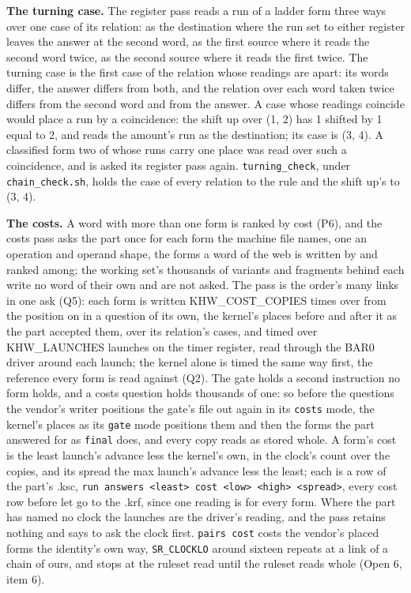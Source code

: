 \textbf{The turning case.} The register pass reads a run of a ladder form three ways over one case of its relation: as the destination where the run set to either register leaves the answer at the second word, as the first source where it reads the second word twice, as the second source where it reads the first twice. The turning case is the first case of the relation whose readings are apart: its words differ, the answer differs from both, and the relation over each word taken twice differs from the second word and from the answer. A case whose readings coincide would place a run by a coincidence: the shift up over (1, 2) has 1 shifted by 1 equal to 2, and reads the amount's run as the destination; its case is (3, 4). A classified form two of whose runs carry one place was read over such a coincidence, and is asked its register pass again. \texttt{turning\_\allowbreak{}check}, under \texttt{chain\_\allowbreak{}check.\allowbreak{}sh}, holds the case of every relation to the rule and the shift up's to (3, 4).

\textbf{The costs.} A word with more than one form is ranked by cost (P6), and the costs pass asks the part once for each form the machine file names, one an operation and operand shape, the forms a word of the web is written by and ranked among; the working set's thousands of variants and fragments behind each write no word of their own and are not asked. The pass is the order's many links in one ask (Q5): each form is written KHW\_\allowbreak{}COST\_\allowbreak{}COPIES times over from the position on in a question of its own, the kernel's places before and after it as the part accepted them, over its relation's cases, and timed over KHW\_\allowbreak{}LAUNCHES launches on the timer register, read through the BAR0 driver around each launch; the kernel alone is timed the same way first, the reference every form is read against (Q2). The gate holds a second instruction no form holds, and a costs question holds thousands of one: so before the questions the vendor's writer positions the gate's file out again in its \texttt{costs} mode, the kernel's places as its \texttt{gate} mode positions them and then the forms the part answered for as \texttt{final} does, and every copy reads as stored whole. A form's cost is the least launch's advance less the kernel's own, in the clock's count over the copies, and its spread the max launch's advance less the least; each is a row of the part's .ksc, \texttt{run answers <least> cost <low> <high> <spread>}, every cost row before let go to the .krf, since one reading is for every form. Where the part has named no clock the launches are the driver's reading, and the pass retains nothing and says to ask the clock first. \texttt{pairs cost} costs the vendor's placed forms the identity's own way, \texttt{SR\_\allowbreak{}CLOCKLO} around sixteen repeats at a link of a chain of ours, and stops at the ruleset read until the ruleset reads whole (Open 6, item 6).

